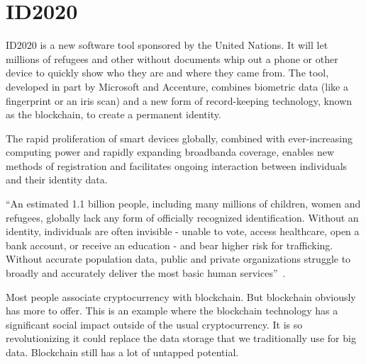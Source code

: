 \section{ID2020}

ID2020 is a new software tool sponsored by the United Nations. It will
let millions of refugees and other without documents whip out a phone
or other device to quickly show who they are and where they came
from. The tool, developed in part by Microsoft and Accenture, combines
biometric data (like a fingerprint or an iris scan) and a new form of
record-keeping technology, known as the blockchain, to create a
permanent identity.
 
The rapid proliferation of smart devices globally, combined with
ever-increasing computing power and rapidly expanding broadbanda
coverage, enables new methods of registration and facilitates ongoing
interaction between individuals and their identity data.
 
``An estimated 1.1 billion people, including many millions of
children, women and refugees, globally lack any form of officially
recognized identification. Without an identity, individuals are often
invisible - unable to vote, access healthcare, open a bank account, or
receive an education - and bear higher risk for trafficking. Without
accurate population data, public and private organizations struggle to
broadly and accurately deliver the most basic human
services''~\cite{hid-sp18-506-NoID}.

Most people associate cryptocurrency with blockchain. But blockchain
obviously has more to offer. This is an example where the blockchain
technology has a significant social impact outside of the usual
cryptocurrency. It is so revolutionizing it could replace the data
storage that we traditionally use for big data. Blockchain still has a
lot of untapped potential.
